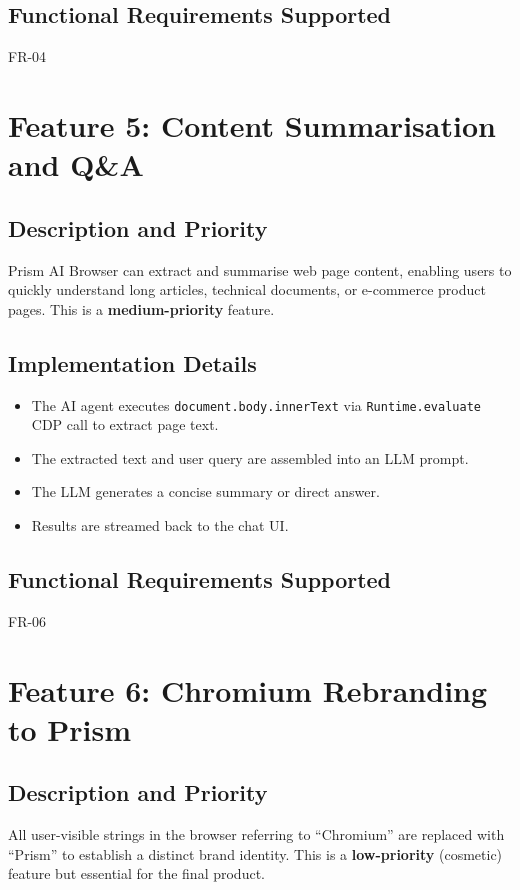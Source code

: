 \subsection{Functional Requirements Supported}
FR-04

\section{Feature 5: Content Summarisation and Q\&A}

\subsection{Description and Priority}
Prism AI Browser can extract and summarise web page content, enabling users to quickly understand long articles, technical documents, or e-commerce product pages. This is a \textbf{medium-priority} feature.

\subsection{Implementation Details}
\begin{itemize}[leftmargin=*]
    \item The AI agent executes \texttt{document.body.innerText} via \texttt{Runtime.evaluate} CDP call to extract page text.
    \item The extracted text and user query are assembled into an LLM prompt.
    \item The LLM generates a concise summary or direct answer.
    \item Results are streamed back to the chat UI.
\end{itemize}

\subsection{Functional Requirements Supported}
FR-06

\section{Feature 6: Chromium Rebranding to Prism}

\subsection{Description and Priority}
All user-visible strings in the browser referring to ``Chromium'' are replaced with ``Prism'' to establish a distinct brand identity. This is a \textbf{low-priority} (cosmetic) feature but essential for the final product.

